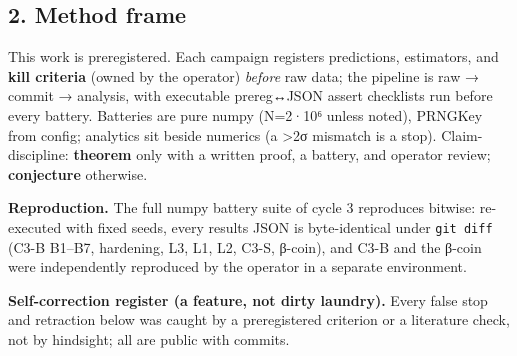 \documentclass[
  11pt]{article}
\begin{document}
\subsection{2. Method frame}\label{method-frame}

This work is preregistered. Each campaign registers predictions,
estimators, and \textbf{kill criteria} (owned by the operator)
\emph{before} raw data; the pipeline is raw → commit → analysis, with
executable prereg↔JSON assert checklists run before every battery.
Batteries are pure numpy (N=2·10⁶ unless noted), PRNGKey from config;
analytics sit beside numerics (a \textgreater2σ mismatch is a stop).
Claim-discipline: \textbf{theorem} only with a written proof, a battery,
and operator review; \textbf{conjecture} otherwise.

\textbf{Reproduction.} The full numpy battery suite of cycle 3
reproduces bitwise: re-executed with fixed seeds, every results JSON is
byte-identical under \texttt{git\ diff} (C3-B B1--B7, hardening, L3, L1,
L2, C3-S, β-coin), and C3-B and the β-coin were independently reproduced
by the operator in a separate environment.

\textbf{Self-correction register (a feature, not dirty laundry).} Every
false stop and retraction below was caught by a preregistered criterion
or a literature check, not by hindsight; all are public with commits.
\end{document}
